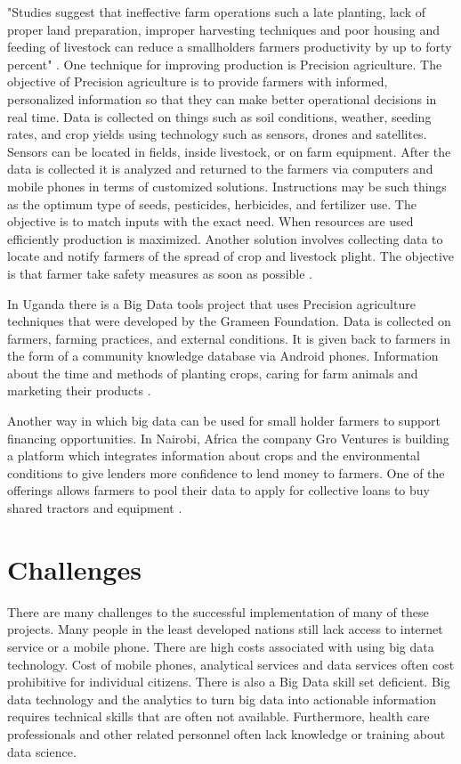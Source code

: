 \documentclass[sigconf]{acmart}
\begin{document}
"Studies suggest that ineffective farm operations such a late planting, lack of proper land preparation, improper harvesting techniques and poor housing and feeding of livestock can reduce a smallholders farmers productivity by up to forty percent" \cite{DevEcon}.
One technique for improving production is Precision agriculture. The objective of Precision agriculture is to provide farmers with informed, personalized information so that they can make better operational decisions in real time. Data is collected on things such as soil conditions, weather, seeding rates, and crop yields using technology such as sensors, drones and satellites\cite{DevEcon}. Sensors can be located in fields, inside livestock, or on farm equipment.  After the data is collected it is analyzed and returned to the farmers via computers and mobile phones in terms of customized solutions. Instructions may be such things as the optimum type of seeds, pesticides, herbicides, and fertilizer use. The objective is to match inputs with the exact need. When resources are used efficiently production is maximized. Another solution involves collecting data to locate and notify farmers of the spread of crop and livestock plight. The objective is that farmer take safety measures as soon as possible \cite{www-google-Hffpst}.

In Uganda there is a Big Data tools project that uses Precision agriculture techniques that were developed by the Grameen Foundation. Data is collected on farmers, farming practices, and external conditions. It is given back to farmers in the form of a community knowledge database via Android phones. Information about the time and methods of planting crops, caring for farm animals and marketing their products \cite{DevEcon}.

Another way in which big data can be used for small holder farmers to support financing opportunities. In Nairobi, Africa the company Gro Ventures is building a platform which integrates information about crops and the environmental conditions to give lenders more confidence to lend money to farmers. One of the offerings allows farmers to pool their data to apply for collective loans to buy shared tractors and equipment \cite{www-google-Hffpst}.  

\section{Challenges}
There are many challenges to the successful implementation of many of these projects.  Many people in the least developed nations still lack access to internet service or a mobile phone. There are high costs associated with using big data technology. Cost of mobile phones, analytical services and data services often cost prohibitive for individual citizens. There is also a Big Data skill set deficient. Big data technology and the analytics to turn big data into actionable information requires technical skills that are often not available. Furthermore, health care professionals and other related personnel often lack knowledge or training about data science. 
\end{document}
